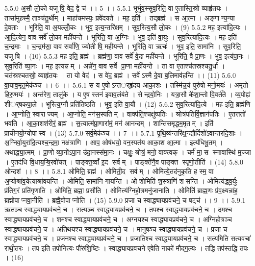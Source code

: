 5.5.0
अ॒सौ लो॒को यजू॑षि॒ वेद॒ द्वे च॑ ।। 5 ।।
5.5.1
भूर्भुव॒स्सुव॒रिति॒ वा ए॒तास्ति॒स्रो व्याहृ॑तयः । तासा॑मुहस्मै॒ ताञ्च॑तु॒र्थीम् । माहा॑चमस्यः॒ प्रवे॑दयते । मह॒ इति॑ । तद्ब्रह्म॑ । स आ॒त्मा । अङ्गान्य॒न्या दे॒वताः । भूरिति॒ वा अ॒यल्लोँ॒कः । भुव॒ इत्य॒न्तरि॑क्षम् । सुव॒रित्य॒सौ लो॒कः । (9)
5.5.2
मह॒ इत्या॑दि॒त्यः । आ॒दि॒त्येन॒ वाव सर्वे॑ लो॒का मही॑यन्ते । भूरिति॒ वा अ॒ग्निः । भुव॒ इति॑ वा॒युः । सुव॒रित्या॑दि॒त्यः । मह॒ इति॑ च॒न्द्रमाः । च॒न्द्रम॑सा॒ वाव सर्वा॑णि॒ ज्योती॑षि॒ मही॑यन्ते । भूरिति॒ वा ऋचः॑ । भुव॒ इति॒ सामा॑नि । सुव॒रिति॒ यजू॑षि । (10)
5.5.3
मह॒ इति॒ ब्रह्म॑ । ब्रह्म॑णा॒ वाव सर्वे॑ वे॒दा मही॑यन्ते । भूरिति॒ वै प्रा॒णः । भुव॒ इत्य॑पा॒नः । सुव॒रिति॑ व्या॒नः । मह॒ इत्यन्नम् । अन्ने॑न॒ वाव सर्वे प्रा॒णा मही॑यन्ते । ता वा ए॒ताश्च॑तस्रश्चतु॒र्धा । चत॑स्रश्चतस्रो॒ व्याहृ॑तयः । ता यो वेद॑ । स वे॑द॒ ब्रह्म॑ । सर्वेऽस्मै दे॒वा ब॒लिमाव॑हन्ति ।। (11)
5.6.0
वा॒याव॒मृत॒मेक॑ञ्च ।। 6 ।।
5.6.1
स य ए॒षोऽन्तर््हृ॑दय आका॒शः । तस्मि॑न्न॒यं पुरु॑षो मनो॒मयः॑ । अमृ॑तो हिर॒ण्मयः॑ । अन्त॑रेण॒ तालु॑के । य ए॒ष स्तन॑ इवाव॒लंब॑ते । सेन्द्रयो॒निः । यत्रा॒सौ के॑शा॒न्तो वि॒वर्त॑ते । व्य॒पोह्य॑ शीर््षकपा॒ले । भूरित्य॒ग्नौ प्रति॑तिष्ठति । भुव॒ इति॑ वा॒यौ । (12)
5.6.2
सुव॒रित्या॑दि॒त्ये । मह॒ इति॒ ब्रह्म॑णि । आ॒प्नोति॒ स्वाराज्यम् । आ॒प्नोति॒ मन॑स॒स्पतिम् । वाक्प॑ति॒श्चक्षु॑ष्पतिः । श्रोत्र॑पतिर्वि॒ज्ञान॑पतिः । ए॒तत्ततो॑ भवति । आ॒का॒शश॑रीरं॒ ब्रह्म॑ । स॒त्यात्म॑प्रा॒णारा॑मं॒ मन॑ आनन्दम् । शान्ति॑समृद्धम॒मृतम् । इति॑ प्राचीनयो॒ग्योपास्व । (13)
5.7.0
सर्व॒मेक॑ञ्च ।। 7 ।।
5.7.1
पृ॒थि॒व्य॑न्तरि॑क्ष॒न्द्यौर्दिशो॑ऽवान्तरदि॒शाः । अ॒ग्निर्वा॒युरा॑दि॒त्यश्च॒न्द्रमा॒ नक्ष॑त्राणि । आप॒ ओष॑धयो॒ वन॒स्पत॑य आका॒श आ॒त्मा । इत्य॑धिभू॒तम् । अथाद्ध्या॒त्मम् । प्रा॒णो व्या॒नो॑ऽपा॒न उ॑दा॒नस्स॑मा॒नः । चक्षुः॒ श्रोत्रं॒ मनो॒ वाक्त्वक् । चर्म॑ मा॒॒स स्नावास्थि॑ म॒ज्जा । ए॒तद॑धि वि॒धाय॒ऱ्षि॒रवो॑चत् । पाङ्क्त॒व्वाँ इ॒द सर्वम् । पाङ्क्ते॑नै॒व पाङ्क्त॑ स्पृणो॒तीति॑ । (14)
5.8.0
ओन्दश॑ ।। 8 ।।
5.8.1
ओमिति॒ ब्रह्म॑ । ओमिती॒द सर्वम् । ओमित्ये॒तद॑नुकृति ह स्म॒ वा अ॒प्योश्रा॑व॒येत्याश्रा॑वयन्ति । ओमिति॒ सामा॑नि गायन्ति । ओशोमिति॑ श॒स्त्राणि॑ शसन्ति । ओमित्य॑द्ध्व॒र्युः प्र॑तिग॒रं प्रति॑गृणाति । ओमिति॒ ब्रह्मा॒ प्रसौ॑ति । ओमित्य॑ग्निहो॒त्रमनु॑जानाति । ओमिति॑ ब्राह्म॒णः प्र॑व॒क्ष्यन्ना॑ह॒ ब्रह्मोपाप्नवा॒नीति॑ । ब्रह्मै॒वोपाप्नोति । (15)
5.9.0
प्रजा च स्वाद्ध्यायप्रव॑चने॒ च षट्च॑ ।। 9 ।।
5.9.1
ऋतञ्च स्वाद्ध्यायप्रव॑चने॒ च । सत्यञ्च स्वाद्ध्यायप्रव॑चने॒ च । तपश्च स्वाद्ध्यायप्रव॑चने॒ च । दमश्च स्वाद्ध्यायप्रव॑चने॒ च । शमश्च स्वाद्ध्यायप्रव॑चने॒ च । अग्नयश्च स्वाद्ध्यायप्रव॑चने॒ च । अग्निहोत्रञ्च स्वाद्ध्यायप्रव॑चने॒ च । अतिथयश्च स्वाद्ध्यायप्रव॑चने॒ च । मानुषञ्च स्वाद्ध्यायप्रव॑चने॒ च । प्रजा च स्वाद्ध्यायप्रव॑चने॒ च । प्रजनश्च स्वाद्ध्यायप्रव॑चने॒ च । प्रजातिश्च स्वाद्ध्यायप्रव॑चने॒ च । सत्यमिति सत्यवचा॑ राथी॒तरः । तप इति तपोनित्यः पौ॑रुशि॒ष्टिः । स्वाद्ध्यायप्रवचने एवेति नाको॑ मौद्ग॒ल्यः । तद्धि तप॑स्तद्धि॒ तपः । (16)
